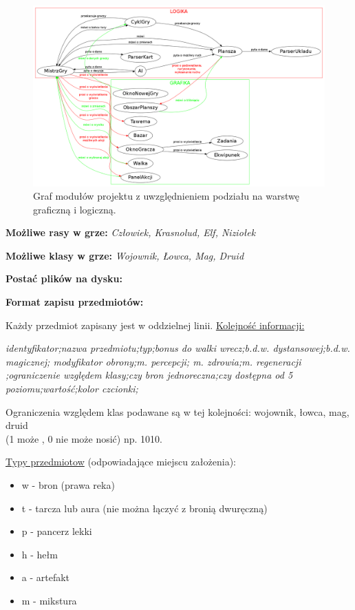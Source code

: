 \documentclass[a4paper, 11pt]{article}
\begin{document}
\newpage

\begin{figure}[ht]

\centering

\includegraphics[scale=0.24]{klasy.png}

\caption{Graf modułów projektu z uwzględnieniem podziału na warstwę graficzną i logiczną.} 

\label{Klasy}

\end{figure}

\noindent\textbf{Możliwe rasy w grze:} \textit{Człowiek, Krasnolud, Elf, Niziołek}

\noindent\textbf{Możliwe klasy w grze:} \textit{Wojownik, Łowca, Mag, Druid }

\vspace{0.5cm}
\noindent\textbf{Postać plików na dysku:}

\textbf{Format zapisu przedmiotów:}

Każdy przedmiot zapisany jest w oddzielnej linii. \underline{Kolejność informacji:}

\textit{identyfikator;nazwa przedmiotu;typ;bonus do walki wrecz;b.d.w. dystansowej;b.d.w. magicznej; modyfikator obrony;m. percepcji; m. zdrowia;m. regeneracji ;ograniczenie względem klasy;czy bron jednoreczna;czy dostępna od 5 poziomu;wartość;kolor czcionki;
}

Ograniczenia względem klas podawane są w tej kolejności: wojownik, łowca, mag, druid\\ (1 może , 0 nie może nosić) np. 1010.

\underline{Typy przedmiotow} (odpowiadające miejscu założenia): 
\begin{itemize}
	\item w - bron (prawa reka)
	\item t - tarcza lub aura (nie można łączyć z bronią dwuręczną)
	\item p - pancerz lekki 
	\item h - hełm
	\item a - artefakt
	\item m - mikstura
\end{itemize}
\end{document}
